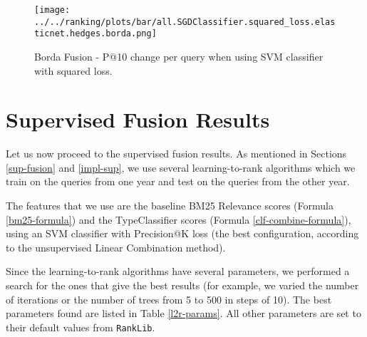 \begin{figure}
\centerline{
  \texttt{[image: ../../ranking/plots/bar/all.SGDClassifier.squared\_loss.elasticnet.hedges.borda.png]}
  }
  \caption{Borda Fusion - P@10 change per query when using SVM classifier with squared loss.}
  \label{borda-query}
\end{figure}


\section{Supervised Fusion Results}
Let us now proceed to the supervised fusion results. As mentioned in Sections \ref{sup-fusion} and \ref{impl-sup}, we use several
learning-to-rank algorithms which we train on the queries from one year and test on the queries from the other year.

The features that we use are the baseline BM25 \textsf{Relevance} scores (Formula \ref{bm25-formula})
and the \textsf{TypeClassifier} scores (Formula \ref{clf-combine-formula}), using an SVM
classifier with Precision@K loss (the best configuration, according to the unsupervised Linear Combination method).

Since the learning-to-rank algorithms have several parameters, we performed a search for the ones that give the best
results (for example, we varied the number of iterations or the number of trees from 5 to 500 in steps of 10).
The best parameters found are listed in Table \ref{l2r-params}. All other parameters are set to their default values from \texttt{RankLib}.

\begin{table}
\centering
\caption{Best parameters found for the learning-to-rank algorithms.}
\label{l2r-params}
\end{table}

